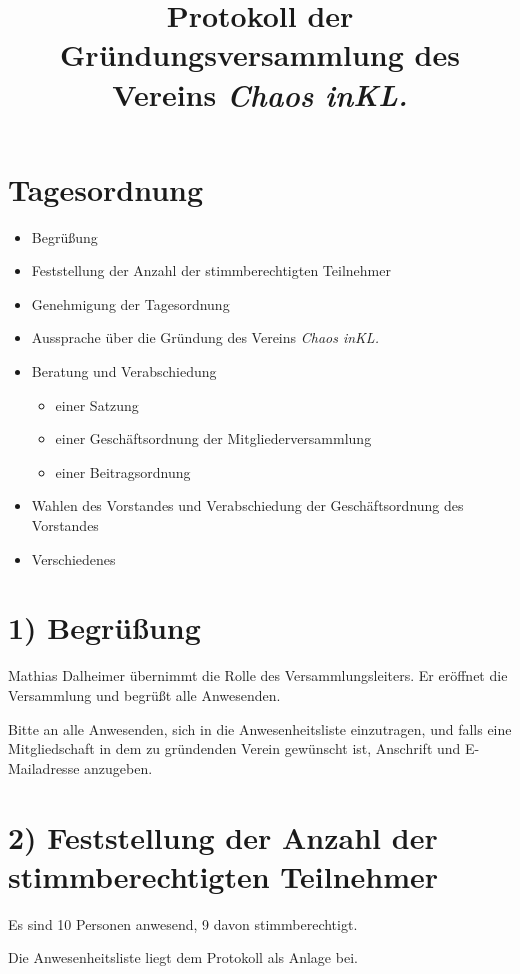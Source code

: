 \documentclass{scrartcl}
\title{Protokoll der Gründungsversammlung des Vereins \emph{Chaos inKL.}}
\begin{document}
 
\maketitle

\section*{Tagesordnung}

\begin{itemize}
  \item Begrüßung
  \item Feststellung der Anzahl der stimmberechtigten Teilnehmer
  \item Genehmigung der Tagesordnung
  \item Aussprache über die Gründung des Vereins \emph{Chaos inKL.}
  \item Beratung und Verabschiedung
  \begin{itemize}
    \item einer Satzung
    \item einer Geschäftsordnung der Mitgliederversammlung
    \item einer Beitragsordnung
  \end{itemize}
  \item Wahlen des Vorstandes und Verabschiedung der Geschäftsordnung des Vorstandes
  \item Verschiedenes
\end{itemize}

\section*{1) Begrüßung}

    Mathias Dalheimer übernimmt die Rolle des Versammlungsleiters.
    Er eröffnet die Versammlung und begrüßt alle Anwesenden.

    Bitte an alle Anwesenden, sich in die Anwesenheitsliste einzutragen, und falls eine
    Mitgliedschaft in dem zu gründenden Verein gewünscht ist, Anschrift und E-Mailadresse
    anzugeben.

\section*{2) Feststellung der Anzahl der stimmberechtigten Teilnehmer}

    Es sind 10 Personen anwesend, 9 davon stimmberechtigt.

    Die Anwesenheitsliste liegt dem Protokoll als Anlage bei.
\end{document}
